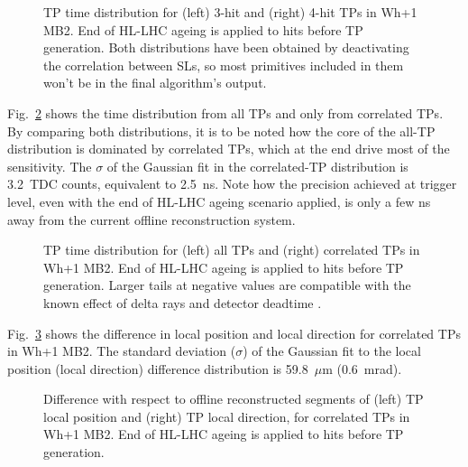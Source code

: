 \documentclass[../main.tex]{subfiles}
\begin{document}
\begin{figure}[h!]
\begin{center}
\end{center}
\caption[Superlayer trigger primitives' time distributions]{TP time distribution for (left) 3-hit and (right) 4-hit TPs in Wh+1 MB2. End of HL-LHC ageing is applied to hits before TP generation. Both distributions have been obtained by deactivating the correlation between SLs, so most primitives included in them won't be in the final algorithm's output.}
\label{dts:fig:time_uncor}
\end{figure}

Fig.~\ref{dts:fig:time} shows the time distribution from all TPs and only from correlated TPs. By comparing both distributions, it is to be noted how the core of the all-TP distribution is dominated by correlated TPs, which at the end drive most of the sensitivity. The $\sigma$ of the Gaussian fit in the correlated-TP distribution is 3.2~TDC counts, equivalent to 2.5~ns. Note how the precision achieved at trigger level, even with the end of HL-LHC ageing scenario applied, is only a few ns away from the current offline reconstruction system.

\begin{figure}[h!]
\begin{center}
\end{center}
\caption[Trigger primitives' time distributions]{TP time distribution for (left) all TPs and (right) correlated TPs in Wh+1 MB2. End of HL-LHC ageing is applied to hits before TP generation. Larger tails at negative values are compatible with the known effect of delta rays and detector deadtime \cite{intro:id:muon_13tev}.}
\label{dts:fig:time}
\end{figure}


Fig.~\ref{dts:fig:resol_fits} shows the difference in local position and local direction for correlated TPs in Wh+1 MB2. The standard deviation ($\sigma$) of the Gaussian fit to the local position (local direction) difference distribution is 59.8~$\mu$m (0.6~mrad).

\begin{figure}[h!]
\begin{center}
\end{center}
\caption[Position and direction resolution with respect to segments]{Difference with respect to offline reconstructed segments of (left) TP local position and (right) TP local direction, for correlated TPs in Wh+1 MB2. End of HL-LHC ageing is applied to hits before TP generation.}
\label{dts:fig:resol_fits}
\end{figure}
\end{document}
